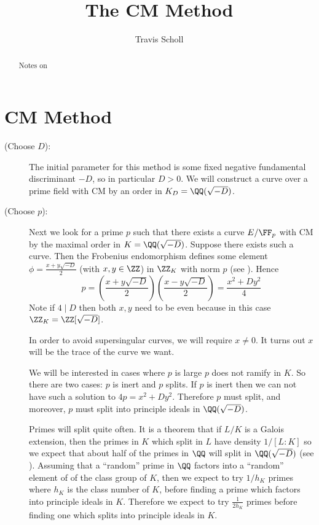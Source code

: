 \documentclass[11pt]{article}
\newcommand{\mytitle}{The CM Method}
\newcommand{\myauthor}{Travis Scholl}
\begin{document}
\title{\bfseries\sffamily \mytitle}
\author{\sc \myauthor }
\maketitle

\begin{abstract}
	Notes on \cite{blake1999elliptic}
\end{abstract}

\section{CM Method}

\begin{description}
	\item[(Choose $D$):]
	
	The initial parameter for this method is some fixed negative fundamental discriminant $-D$, so in particular $D>0$. We will construct a curve over a prime field with CM by an order in $K_D = \QQ(\sqrt{-D})$.
	
	\item[(Choose $p$):]
	
	Next we look for a prime $p$ such that there exists a curve $E/\FF_p$ with CM by the maximal order in $K = \QQ(\sqrt{-D})$. Suppose there exists such a curve. Then the Frobenius endomorphism defines some element $\phi = \frac{x+y\sqrt{-D}}{2}$ (with $x,y\in\ZZ$) in $\ZZ_K$ with norm $p$ (see \cite[Thm.~V.2.3.1]{silverman2009arithmetic}). Hence
	$$
	p
	= \left(\frac{x + y\sqrt{-D}}{2}\right)\left(\frac{x - y\sqrt{-D}}{2}\right)
	= \frac{x^2 + Dy^2}{4}
	$$
	Note if $4 \mid D$ then both $x,y$ need to be even because in this case $\ZZ_K = \ZZ[\sqrt{-D}]$.
	
	In order to avoid supersingular curves, we will require $x\neq 0$. It turns out $x$ will be the trace of the curve we want.
	
	We will be interested in cases where $p$ is large $p$ does not ramify in $K$. So there are two cases: $p$ is inert and $p$ splits. If $p$ is inert then we can not have such a solution to $4p = x^2 + Dy^2$. Therefore $p$ must split, and moreover, $p$ must split into principle ideals in $\QQ(\sqrt{-D})$.

	\begin{rem}
		Primes will split quite often. It is a theorem that if $L/K$ is a Galois extension, then the primes in $K$ which split in $L$ have density $1/[L:K]$ so we expect that about half of the primes in $\QQ$ will split in $\QQ(\sqrt{-D})$ (see \cite[Cor.~8.32]{milneANT}).
		Assuming that a ``random'' prime in $\QQ$ factors into a ``random'' element of of the class group of $K$, then we expect to try $1/h_K$ primes where $h_K$ is the class number of $K$, before finding a prime which factors into principle ideals in $K$. Therefore we expect to try $\frac{1}{2h_K}$ primes before finding one which splits into principle ideals in $K$.
	\end{rem}
	

\end{description}
\end{document}
